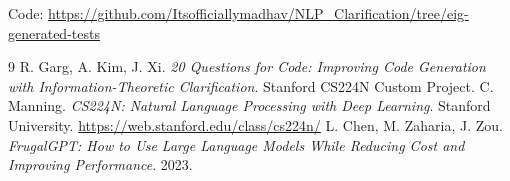 \documentclass[11pt]{article}
\begin{document}
\noindent Code: \url{https://github.com/Itsofficiallymadhav/NLP_Clarification/tree/eig-generated-tests}

\begin{thebibliography}{9}
\small
{} R. Garg, A. Kim, J. Xi. \textit{20 Questions for Code: Improving Code Generation with Information-Theoretic Clarification}. Stanford CS224N Custom Project.
 C. Manning. \textit{CS224N: Natural Language Processing with Deep Learning}. Stanford University. \url{https://web.stanford.edu/class/cs224n/}
 L. Chen, M. Zaharia, J. Zou. \textit{FrugalGPT: How to Use Large Language Models While Reducing Cost and Improving Performance}. 2023.
\end{thebibliography}
\end{document}
